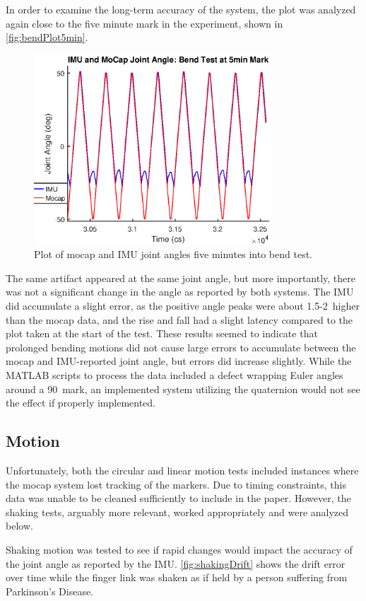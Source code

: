 \documentclass[letterpaper, 10 pt, conference]{ieeeconf}  %
\begin{document}
In order to examine the long-term accuracy of the system, the plot was analyzed again close to the five minute mark in the experiment, shown in \autoref{fig:bendPlot5min}.

\begin{figure}[thpb]
	\centering
	\includegraphics[width = 3.5in]{finger_bend_imuANDmocap.eps}
    \caption{Plot of mocap and IMU joint angles five minutes into bend test.}
    \label{fig:bendPlot5min}
\end{figure}

The same artifact appeared at the same joint angle, but more importantly, there was not a significant change in the angle as reported by both systems. The IMU did accumulate a slight error, as the positive angle peaks were about 1.5-2\degree\ higher than the mocap data, and the rise and fall had a slight latency compared to the plot taken at the start of the test. These results seemed to indicate that prolonged bending motions did not cause large errors to accumulate between the mocap and IMU-reported joint angle, but errors did increase slightly. While the MATLAB scripts to process the data included a defect wrapping Euler angles around a 90\degree\ mark, an implemented system utilizing the quaternion would not see the effect if properly implemented.

\subsection{Motion}
Unfortunately, both the circular and linear motion tests included instances where the mocap system lost tracking of the markers. Due to timing constraints, this data was unable to be cleaned sufficiently to include in the paper. However, the shaking tests, arguably more relevant, worked appropriately and were analyzed below.

Shaking motion was tested to see if rapid changes would impact the accuracy of the joint angle as reported by the IMU. \autoref{fig:shakingDrift} shows the drift error over time while the finger link was shaken as if held by a person suffering from Parkinson's Disease.
\end{document}
